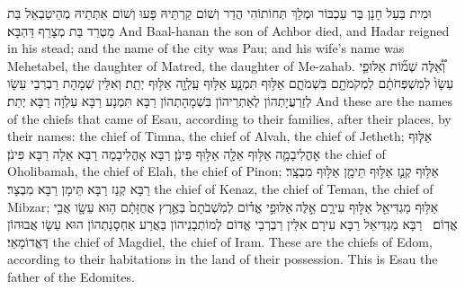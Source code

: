{וּמִית בַּעַל חָנָן בַּר עַכְבּוֹר וּמְלַךְ תְּחוֹתוֹהִי הֲדַר וְשׁוֹם קַרְתֵּיהּ פָּעוּ וְשׁוֹם אִתְּתֵיהּ מְהֵיטַבְאֵל בַּת מַטְרֵד בַּת מְצָרֵף דַּהְבָּא׃}
{And Baal-hanan the son of Achbor died, and Hadar reigned in his stead; and the name of the city was Pau; and his wife’s name was Mehetabel, the daughter of Matred, the daughter of Me-zahab.}{}
{וְ֠אֵ֠לֶּה שְׁמ֞וֹת אַלּוּפֵ֤י עֵשָׂו֙ לְמִשְׁפְּחֹתָ֔ם לִמְקֹמֹתָ֖ם בִּשְׁמֹתָ֑ם אַלּ֥וּף תִּמְנָ֛ע אַלּ֥וּף עַֽלְוָ֖ה אַלּ֥וּף יְתֵֽת׃}
{וְאִלֵּין שְׁמָהָת רַבְרְבֵי עֵשָׂו לְזַרְעֲיָתְהוֹן לְאַתְרֵיהוֹן בִּשְׁמָהָתְהוֹן רַבָּא תִּמְנָע רַבָּא עַלְוָה רַבָּא יְתֵת׃}
{And these are the names of the chiefs that came of Esau, according to their families, after their places, by their names: the chief of Timna, the chief of Alvah, the chief of Jetheth;}{}
{אַלּ֧וּף אׇהֳלִיבָמָ֛ה אַלּ֥וּף אֵלָ֖ה אַלּ֥וּף פִּינֹֽן׃}
{רַבָּא אָהֳלִיבָמָה רַבָּא אֵלָה רַבָּא פִּינֹן׃}
{the chief of Oholibamah, the chief of Elah, the chief of Pinon;}{}
{אַלּ֥וּף קְנַ֛ז אַלּ֥וּף תֵּימָ֖ן אַלּ֥וּף מִבְצָֽר׃}
{רַבָּא קְנַז רַבָּא תֵּימָן רַבָּא מִבְצָר׃}
{the chief of Kenaz, the chief of Teman, the chief of Mibzar;}{}
{אַלּ֥וּף מַגְדִּיאֵ֖ל אַלּ֣וּף עִירָ֑ם אֵ֣לֶּה \legarmeh  אַלּוּפֵ֣י אֱד֗וֹם לְמֹֽשְׁבֹתָם֙ בְּאֶ֣רֶץ אֲחֻזָּתָ֔ם ה֥וּא עֵשָׂ֖ו אֲבִ֥י אֱדֽוֹם׃ \petucha }
{רַבָּא מַגְדִּיאֵל רַבָּא עִירָם אִלֵּין רַבְרְבֵי אֱדוֹם לְמוֹתְבָנֵיהוֹן בַּאֲרַע אַחְסָנַתְהוֹן הוּא עֵשָׂו אֲבוּהוֹן דֶּאֱדוֹמָאֵי׃}
{the chief of Magdiel, the chief of Iram. These are the chiefs of Edom, according to their habitations in the land of their possession. This is Esau the father of the Edomites.}{}
\newperek
{}
